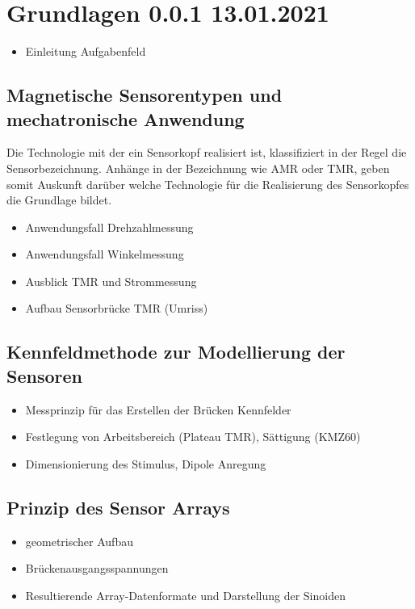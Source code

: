 %

\chapter{Grundlagen 0.0.1 13.01.2021}\label{ch:grundlagen}
	\begin{itemize}
		\item Einleitung Aufgabenfeld
	\end{itemize}

\section{Magnetische Sensorentypen und mechatronische Anwendung}
Die Technologie mit der ein Sensorkopf realisiert ist, klassifiziert in der Regel die Sensorbezeichnung. Anhänge in der Bezeichnung wie AMR oder TMR, geben somit Auskunft darüber welche Technologie für die Realisierung des Sensorkopfes die Grundlage bildet.
	\begin{itemize}
		\item Anwendungsfall Drehzahlmessung
		\item Anwendungsfall Winkelmessung
		\item Ausblick TMR und Strommessung
		\item Aufbau Sensorbrücke TMR (Umriss)
	\end{itemize}

\section{Kennfeldmethode zur Modellierung der Sensoren}
	\begin{itemize}
		\item Messprinzip für das Erstellen der Brücken Kennfelder
		\item Festlegung von Arbeitsbereich (Plateau TMR), Sättigung (KMZ60)
		\item Dimensionierung des Stimulus, Dipole Anregung
	\end{itemize}

\section{Prinzip des Sensor Arrays}
	\begin{itemize}
		\item geometrischer Aufbau
		\item Brückenausgangsspannungen
		\item Resultierende Array-Datenformate und Darstellung der Sinoiden
	\end{itemize}

